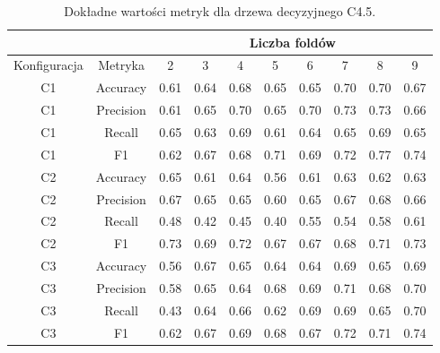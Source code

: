 \begin{table}[H]
  \center
\begin{tabular}{|c|c|c|c|c|c|c|c|c|c|}  \hline
  \multicolumn{2}{|c|}{} & \multicolumn{8}{c|}{Liczba foldów} \\ \hline
Konfiguracja &    Metryka &     2 &     3 &     4 &     5 &     6 &     7 &     8 &     9 \\ \hline
          C1 &   Accuracy &  0.61 &  0.64 &  0.68 &  0.65 &  0.65 &  0.70 &  0.70 &  0.67 \\ \hline
          C1 &  Precision &  0.61 &  0.65 &  0.70 &  0.65 &  0.70 &  0.73 &  0.73 &  0.66 \\ \hline
          C1 &     Recall &  0.65 &  0.63 &  0.69 &  0.61 &  0.64 &  0.65 &  0.69 &  0.65 \\ \hline
          C1 &         F1 &  0.62 &  0.67 &  0.68 &  0.71 &  0.69 &  0.72 &  0.77 &  0.74 \\ \hline \hline
          C2 &   Accuracy &  0.65 &  0.61 &  0.64 &  0.56 &  0.61 &  0.63 &  0.62 &  0.63 \\ \hline
          C2 &  Precision &  0.67 &  0.65 &  0.65 &  0.60 &  0.65 &  0.67 &  0.68 &  0.66 \\ \hline
          C2 &     Recall &  0.48 &  0.42 &  0.45 &  0.40 &  0.55 &  0.54 &  0.58 &  0.61 \\ \hline
          C2 &         F1 &  0.73 &  0.69 &  0.72 &  0.67 &  0.67 &  0.68 &  0.71 &  0.73 \\ \hline \hline
          C3 &   Accuracy &  0.56 &  0.67 &  0.65 &  0.64 &  0.64 &  0.69 &  0.65 &  0.69 \\ \hline
          C3 &  Precision &  0.58 &  0.65 &  0.64 &  0.68 &  0.69 &  0.71 &  0.68 &  0.70 \\ \hline
          C3 &     Recall &  0.43 &  0.64 &  0.66 &  0.62 &  0.69 &  0.69 &  0.65 &  0.70 \\ \hline
          C3 &         F1 &  0.62 &  0.67 &  0.69 &  0.68 &  0.67 &  0.72 &  0.71 &  0.74 \\ \hline
\end{tabular}


  \caption{Dokładne wartości metryk dla drzewa decyzyjnego C4.5.}
\end{table}

